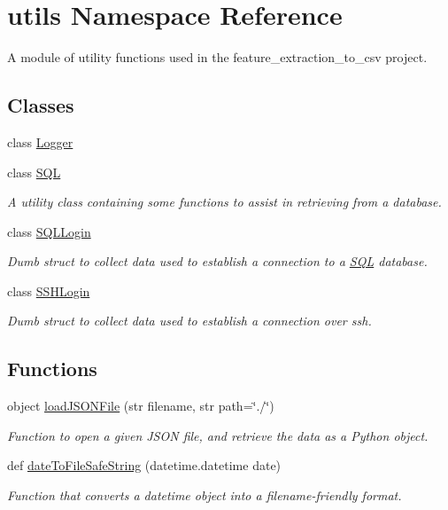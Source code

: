 \hypertarget{namespaceutils}{}\section{utils Namespace Reference}
\label{namespaceutils}


A module of utility functions used in the feature\+\_\+extraction\+\_\+to\+\_\+csv project.  


\subsection*{Classes}
\begin{DoxyCompactItemize}
\item 
class \mbox{\hyperlink{classutils_1_1_logger}{Logger}}
\item 
class \mbox{\hyperlink{classutils_1_1_s_q_l}{S\+QL}}
\begin{DoxyCompactList}\small\item\em A utility class containing some functions to assist in retrieving from a database. \end{DoxyCompactList}\item 
class \mbox{\hyperlink{classutils_1_1_s_q_l_login}{S\+Q\+L\+Login}}
\begin{DoxyCompactList}\small\item\em Dumb struct to collect data used to establish a connection to a \mbox{\hyperlink{classutils_1_1_s_q_l}{S\+QL}} database. \end{DoxyCompactList}\item 
class \mbox{\hyperlink{classutils_1_1_s_s_h_login}{S\+S\+H\+Login}}
\begin{DoxyCompactList}\small\item\em Dumb struct to collect data used to establish a connection over ssh. \end{DoxyCompactList}\end{DoxyCompactItemize}
\subsection*{Functions}
\begin{DoxyCompactItemize}
\item 
object \mbox{\hyperlink{namespaceutils_a05bb98273ce91cd5c7922286b703596f}{load\+J\+S\+O\+N\+File}} (str filename, str path=\char`\"{}./\char`\"{})
\begin{DoxyCompactList}\small\item\em Function to open a given J\+S\+ON file, and retrieve the data as a Python object. \end{DoxyCompactList}\item 
def \mbox{\hyperlink{namespaceutils_ab2f8ec31af461e89fcc8e5d030cfd5fc}{date\+To\+File\+Safe\+String}} (datetime.\+datetime date)
\begin{DoxyCompactList}\small\item\em Function that converts a datetime object into a filename-\/friendly format. \end{DoxyCompactList}\end{DoxyCompactItemize}


